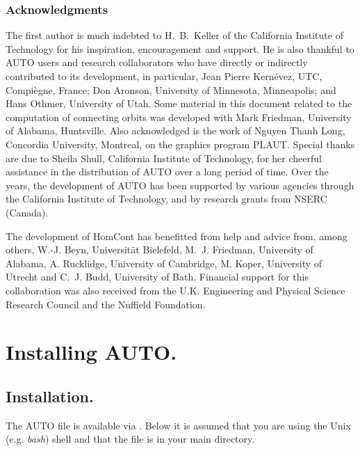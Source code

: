 \documentclass[12pt]{report}
\begin{document}
\subsection*{Acknowledgments}
The first author is much indebted to H.~B.~Keller 
of the California Institute of Technology for his inspiration,
encouragement and support.
He is also thankful to {\cal AUTO} users and research collaborators who have 
directly or indirectly contributed to its development,
in particular, 
Jean Pierre Kern\'evez, UTC, Compi\`egne, France;
Don Aronson, University of Minnesota, Minneapolis; and 
Hans Othmer, University of Utah.
Some material in this document related to the computation of connecting orbits
was developed with Mark Friedman, University of Alabama, Huntsville.
Also acknowledged is the work of Nguyen Thanh Long,
Concordia University, Montreal, on the graphics program {\cal PLAUT}.
Special thanks are due to Sheila Shull, California Institute of Technology,
for her cheerful assistance in the distribution of {\cal AUTO} over a long period
of time.
Over the years, the development of {\cal AUTO} has been supported by
various agencies through the California Institute of Technology, and
by research grants from NSERC (Canada).

The development of {\cal HomCont} has benefitted from help and advice from, 
among others, 
W.-J. Beyn, Universit\"{a}t Bielefeld,
M.~J. Friedman, University of Alabama,
A. Rucklidge, University of Cambridge, 
M. Koper, University of Utrecht and 
C.~J. Budd, University of Bath.
Financial support for this collaboration was also received from the U.K.
Engineering and Physical Science Research Council and the Nuffield Foundation.

\chapter{Installing {\cal AUTO}.} \label{ch:Installing_AUTO}
\section{ Installation.} \label{sec:Installation}
The {\cal AUTO} file  is
available via .
Below it is assumed that you are using the Unix (e.g. \emph{bash}) shell 
and that the file  is in your main directory.
\end{document}
